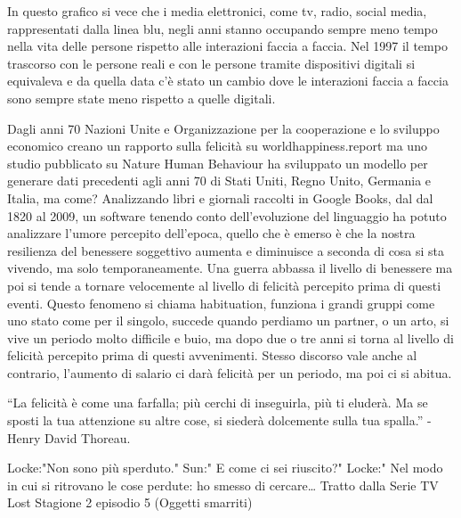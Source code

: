 \documentclass[12pt]{book} %
\begin{document}
\begin{mdframed}[linewidth=1pt]
In questo grafico si vece che i media elettronici, come tv, radio, social media, rappresentati dalla linea blu, negli anni stanno occupando sempre meno tempo nella vita delle persone rispetto alle interazioni faccia a faccia. Nel 1997 il tempo trascorso con le persone reali e con le persone tramite dispositivi digitali si equivaleva e da quella data c'è stato un cambio dove le interazioni faccia a faccia sono sempre state meno rispetto a quelle digitali.

\end{mdframed}

Dagli anni 70 Nazioni Unite e Organizzazione per la cooperazione e lo sviluppo economico creano un rapporto sulla
felicità su worldhappiness.report ma uno studio pubblicato su Nature Human
Behaviour ha sviluppato un modello per generare dati
precedenti agli anni 70 di Stati Uniti, Regno Unito, Germania e Italia, ma come? Analizzando libri e giornali raccolti
in Google Books, dal dal 1820 al 2009, un software tenendo conto dell'evoluzione del linguaggio ha
potuto analizzare l'umore percepito dell'epoca, quello che è emerso è che la
nostra resilienza del benessere soggettivo aumenta e diminuisce a seconda di cosa si sta vivendo, ma solo
temporaneamente. Una guerra abbassa il livello di benessere ma poi si tende a tornare velocemente al livello di
felicità percepito prima di questi eventi. Questo fenomeno si chiama habituation, funziona i grandi gruppi come uno
stato come per il singolo, succede quando perdiamo un partner, o un arto, si vive un periodo molto difficile e buio, ma
dopo due o tre anni si torna al livello di felicità percepito prima di questi avvenimenti. Stesso discorso vale anche
al contrario, l'aumento di salario ci darà felicità per un periodo, ma poi ci si
abitua.


\bigskip

“La felicità è come una farfalla; più cerchi di inseguirla, più ti eluderà. Ma se sposti la tua attenzione su altre
cose, si siederà dolcemente sulla tua spalla.” - Henry David Thoreau.

Locke:"Non sono più sperduto." 
Sun:" E come ci sei riuscito?" 
Locke:" Nel modo in cui si ritrovano le cose perdute: ho smesso di cercare…
Tratto dalla Serie TV Lost Stagione 2 episodio 5 (Oggetti smarriti)
\end{document}

